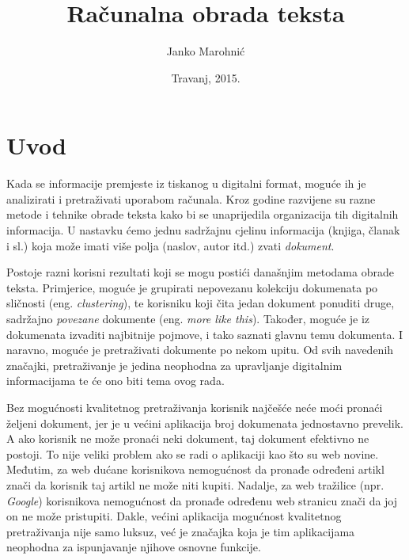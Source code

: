 \documentclass[a4paper,twoside,12pt]{scrreprt}
\title{Računalna obrada teksta}
\author{Janko Marohnić}
\date{Travanj, 2015.}
\begin{document}
\frontmatter

\chapter{Uvod}

Kada se informacije premjeste iz tiskanog u digitalni format, moguće ih je analizirati i pretraživati uporabom računala. Kroz godine razvijene su razne metode i tehnike obrade teksta kako bi se unaprijedila organizacija tih digitalnih informacija. U nastavku ćemo jednu sadržajnu cjelinu informacija (knjiga, članak i sl.) koja može imati više polja (naslov, autor itd.) zvati \textit{dokument}.

Postoje razni korisni rezultati koji se mogu postići današnjim metodama obrade teksta. Primjerice, moguće je grupirati nepovezanu kolekciju dokumenata po sličnosti (eng. \textit{clustering}), te korisniku koji čita jedan dokument ponuditi druge, sadržajno \textit{povezane} dokumente (eng. \textit{more like this}). Također, moguće je iz dokumenata izvaditi najbitnije pojmove, i tako saznati glavnu temu dokumenta. I naravno, moguće je pretraživati dokumente po nekom upitu. Od svih navedenih značajki, pretraživanje je jedina neophodna za upravljanje digitalnim informacijama te će ono biti tema ovog rada.

Bez mogućnosti kvalitetnog pretraživanja korisnik najčešće neće moći pronaći željeni dokument, jer je u većini aplikacija broj dokumenata jednostavno prevelik. A ako korisnik ne može pronaći neki dokument, taj dokument efektivno ne postoji. To nije veliki problem ako se radi o aplikaciji kao što su web novine. Međutim, za web dućane korisnikova nemogućnost da pronađe određeni artikl znači da korisnik taj artikl ne može niti kupiti. Nadalje, za web tražilice (npr. \textit{Google}) korisnikova nemogućnost da pronađe određenu web stranicu znači da joj on ne može pristupiti. Dakle, većini aplikacija mogućnost kvalitetnog pretraživanja nije samo luksuz, već je značajka koja je tim aplikacijama neophodna za ispunjavanje njihove osnovne funkcije.
\end{document}
